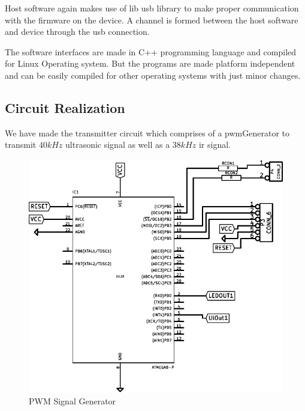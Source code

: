 Host software again makes use of lib \gls{usb} library to make proper communication with the firmware on the device. A channel is formed between the host software and device through the \gls{usb} connection.


The software interfaces are made in C++ programming language and compiled for Linux Operating system. But the programs are made platform independent and can be easily compiled for other operating systems with just minor changes.


\subsection{Circuit Realization}
We have made the transmitter circuit which comprises of a \gls{pwm}Generator to transmit $40kHz$ ultrasonic signal as well as a $38kHz$ \gls{ir} signal.

\begin{figure}
	\centering
	\includegraphics{Images/PWMGenerator.pdf}
	\caption{PWM Signal Generator}
	\label{fig:PWMGenerator}
\end{figure}

